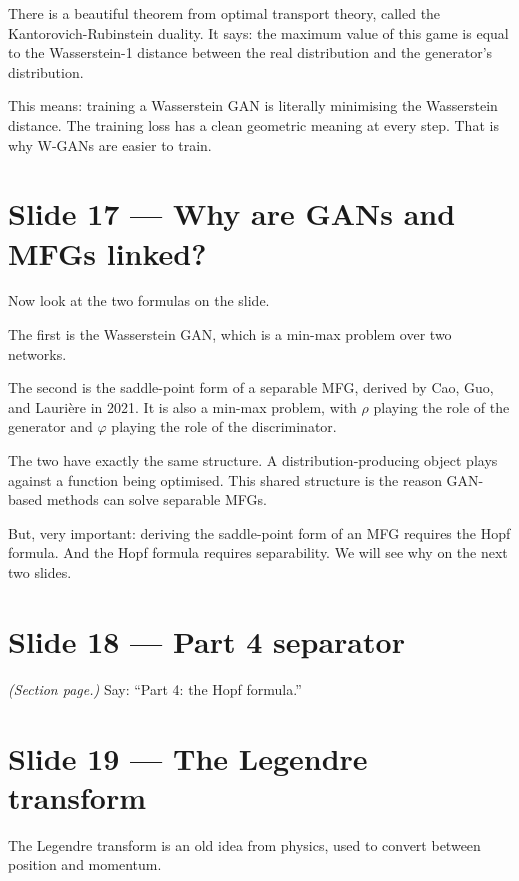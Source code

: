 \documentclass[11pt]{article}
\begin{document}
There is a beautiful theorem from optimal transport theory, called the
Kantorovich-Rubinstein duality. It says: the maximum value of this game is
equal to the Wasserstein-1 distance between the real distribution and the
generator's distribution.

This means: training a Wasserstein GAN is literally minimising the
Wasserstein distance. The training loss has a clean geometric meaning at
every step. That is why W-GANs are easier to train.

\section*{Slide 17 --- Why are GANs and MFGs linked?}

Now look at the two formulas on the slide.

The first is the Wasserstein GAN, which is a min-max problem over two
networks.

The second is the saddle-point form of a separable MFG, derived by Cao,
Guo, and Lauri\`ere in 2021. It is also a min-max problem, with $\rho$
playing the role of the generator and $\varphi$ playing the role of the
discriminator.

The two have exactly the same structure. A distribution-producing object
plays against a function being optimised. This shared structure is the
reason GAN-based methods can solve separable MFGs.

But, very important: deriving the saddle-point form of an MFG requires
the Hopf formula. And the Hopf formula requires separability. We will see
why on the next two slides.

\section*{Slide 18 --- Part 4 separator}

\textit{(Section page.)}  Say: ``Part 4: the Hopf formula.''

\section*{Slide 19 --- The Legendre transform}

The Legendre transform is an old idea from physics, used to convert between
position and momentum.
\end{document}
